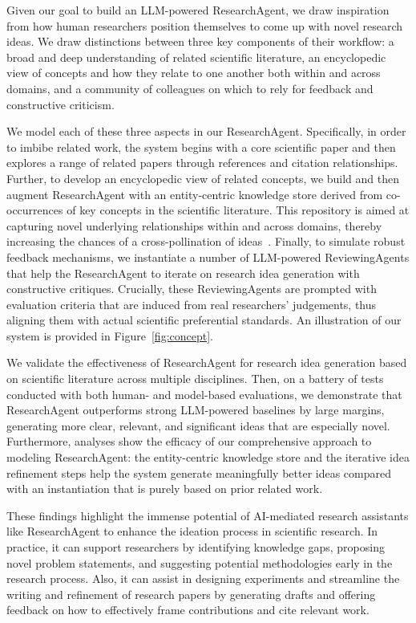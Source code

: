 Given our goal to build an LLM-powered ResearchAgent, we draw inspiration from how human researchers position themselves to come up with novel research ideas. We draw distinctions between three key components of their workflow: a broad and deep understanding of related scientific literature, an encyclopedic view of concepts and how they relate to one another both within and across domains, and a community of colleagues on which to rely for feedback and constructive criticism.

We model each of these three aspects in our ResearchAgent. Specifically, in order to imbibe related work, the system begins with a core scientific paper and then explores a range of related papers through references and citation relationships. Further, to develop an encyclopedic view of related concepts, we build and then augment ResearchAgent with an entity-centric knowledge store derived from co-occurrences of key concepts in the scientific literature. This repository is aimed at capturing novel underlying relationships within and across domains, thereby increasing the chances of a cross-pollination of ideas~\cite{cross-pollination}. Finally, to simulate robust feedback mechanisms, we instantiate a number of LLM-powered ReviewingAgents that help the ResearchAgent to iterate on research idea generation with constructive critiques. Crucially, these ReviewingAgents are prompted with evaluation criteria that are induced from real researchers' judgements, thus aligning them with actual scientific preferential standards. An illustration of our system is provided in Figure~\ref{fig:concept}.

We validate the effectiveness of ResearchAgent for research idea generation based on scientific literature across multiple disciplines. Then, on a battery of tests conducted with both human- and model-based evaluations, we demonstrate that ResearchAgent outperforms strong LLM-powered baselines by large margins, generating more clear, relevant, and significant ideas that are especially novel. Furthermore, analyses show the efficacy of our comprehensive approach to modeling ResearchAgent: the entity-centric knowledge store and the iterative idea refinement steps help the system generate meaningfully better ideas compared with an instantiation that is purely based on prior related work.

These findings highlight the immense potential of AI-mediated research assistants like ResearchAgent to enhance the ideation process in scientific research. In practice, it can support researchers by identifying knowledge gaps, proposing novel problem statements, and suggesting potential methodologies early in the research process. Also, it can assist in designing experiments and streamline the writing and refinement of research papers by generating drafts and offering feedback on how to effectively frame contributions and cite relevant work.
